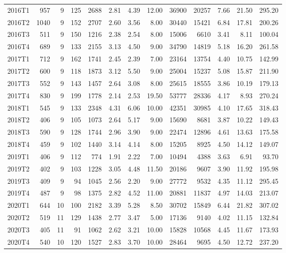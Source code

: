 \begin{table}[htbp]
\begin{tabular}{lrrrrrrrrrrrr}
2016T1 & 957 & 9 & 125 & 2688 & 2.81 & 4.39 & 12.00 & 36900 & 20257 & 7.66 & 21.50 & 295.20 \\
2016T2 & 1040 & 9 & 152 & 2707 & 2.60 & 3.56 & 8.00 & 30440 & 15421 & 6.84 & 17.81 & 200.26 \\
2016T3 & 511 & 9 & 150 & 1216 & 2.38 & 2.54 & 8.00 & 15006 & 6610 & 3.41 & 8.11 & 100.04 \\
2016T4 & 689 & 9 & 133 & 2155 & 3.13 & 4.50 & 9.00 & 34790 & 14819 & 5.18 & 16.20 & 261.58 \\
2017T1 & 712 & 9 & 162 & 1741 & 2.45 & 2.39 & 7.00 & 23164 & 13754 & 4.40 & 10.75 & 142.99 \\
2017T2 & 600 & 9 & 118 & 1873 & 3.12 & 5.50 & 9.00 & 25004 & 15237 & 5.08 & 15.87 & 211.90 \\
2017T3 & 552 & 9 & 143 & 1457 & 2.64 & 3.08 & 8.00 & 25615 & 18555 & 3.86 & 10.19 & 179.13 \\
2017T4 & 830 & 9 & 199 & 1778 & 2.14 & 2.53 & 19.50 & 53777 & 28336 & 4.17 & 8.93 & 270.24 \\
2018T1 & 545 & 9 & 133 & 2348 & 4.31 & 6.06 & 10.00 & 42351 & 30985 & 4.10 & 17.65 & 318.43 \\
2018T2 & 406 & 9 & 105 & 1073 & 2.64 & 5.17 & 9.00 & 15690 & 8681 & 3.87 & 10.22 & 149.43 \\
2018T3 & 590 & 9 & 128 & 1744 & 2.96 & 3.90 & 9.00 & 22474 & 12896 & 4.61 & 13.63 & 175.58 \\
2018T4 & 459 & 9 & 102 & 1440 & 3.14 & 4.14 & 8.00 & 15205 & 8925 & 4.50 & 14.12 & 149.07 \\
2019T1 & 406 & 9 & 112 & 774 & 1.91 & 2.22 & 7.00 & 10494 & 4388 & 3.63 & 6.91 & 93.70 \\
2019T2 & 402 & 9 & 103 & 1228 & 3.05 & 4.48 & 11.50 & 20186 & 9607 & 3.90 & 11.92 & 195.98 \\
2019T3 & 409 & 9 & 94 & 1045 & 2.56 & 2.20 & 9.00 & 27772 & 9532 & 4.35 & 11.12 & 295.45 \\
2019T4 & 487 & 9 & 98 & 1375 & 2.82 & 4.52 & 11.00 & 20881 & 11837 & 4.97 & 14.03 & 213.07 \\
2020T1 & 644 & 10 & 100 & 2182 & 3.39 & 5.28 & 8.50 & 30702 & 15849 & 6.44 & 21.82 & 307.02 \\
2020T2 & 519 & 11 & 129 & 1438 & 2.77 & 3.47 & 5.00 & 17136 & 9140 & 4.02 & 11.15 & 132.84 \\
2020T3 & 405 & 11 & 91 & 1062 & 2.62 & 3.21 & 10.00 & 15828 & 10568 & 4.45 & 11.67 & 173.93 \\
2020T4 & 540 & 10 & 120 & 1527 & 2.83 & 3.70 & 10.00 & 28464 & 9695 & 4.50 & 12.72 & 237.20 \\

\end{tabular}
\end{table}

